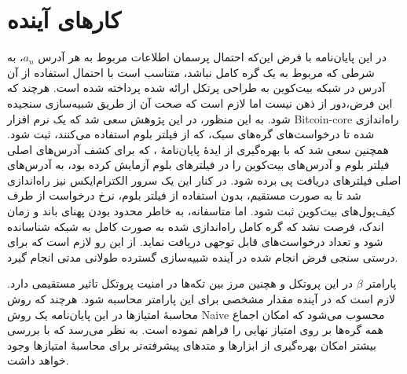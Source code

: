 \section{کار‌های آینده} 

در این پایان‌نامه با فرض این‌که احتمال پرسمان اطلاعات مربوط به هر آدرس $a_n$، به شرطی که مربوط به یک گره کامل نباشد، متناسب است با احتمال استفاده از آن آدرس در شبکه بیت‌کوین به طراحی پرتکل ارائه شده پرداخته شده است. هرچند که این فرض،‌دور از ذهن نیست اما لازم است که صحت آن از طریق شبیه‌سازی سنجیده شود. به این منظور، در این  پژوهش سعی شد که یک نرم افزار 
\gls{Bitcoin-core}
راه‌اندازی شده تا درخواست‌های گره‌های سبک، که از فیلتر بلوم استفاده می‌کنند، ثبت شود. همچنین سعی شد که با بهره‌گیری از ایدهٔ پایان‌نامهٔ \cite{Nick2015}، که برای کشف آدرس‌های اصلی فیلتر بلوم  و  آدرس‌های بیت‌کوین را در فیلتر‌های بلوم آزمایش کرده بود، به آدرس‌های اصلی فیلترهای دریافت پی برده شود. در کنار این یک سرور
الکترام‌ایکس
نیز راه‌اندازی شد تا به صورت مستقیم، بدون استفاده از فیلتر بلوم، نرخ درخواست از طرف کیف‌پول‌های بیت‌کوین ثبت شود. اما متاسفانه، به خاطر محدود بودن پهنای باند و زمان اندک، فرصت نشد که گره‌ کامل راه‌اندازی شده به صورت کامل به شبکه شناسانده شود و تعداد درخواست‌های قابل توجهی دریافت نماید. از این رو لازم است که برای درستی سنجی فرض انجام شده در آینده شبیه‌سازی‌ گسترده طولانی مدتی انجام گیرد. 

پارامتر $\beta$ در این پروتکل و هچنین مرز بین تکه‌ها در امنیت پروتکل تاثیر مستقیمی دارد. لازم است که در آینده مقدار مشخصی برای این پارامتر محاسبه شود. هرچند که روش محاسبهٔ امتیازها در این پایان‌نامه یک روش 
\gls{Naive} 
محسوب می‌شود که امکان اجماع همه گره‌ها بر روی امتیاز نهایی را فراهم نموده است. به نظر می‌رسد که با بررسی بیشتر امکان بهره‌گیری از ابزار‌ها و متدهای پیشرفته‌تر برای محاسبهٔ امتیا‌ز‌ها وجود خواهد داشت.


